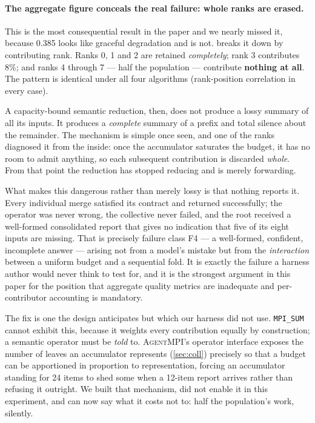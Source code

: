 \documentclass[10pt,twocolumn]{article}
\theoremstyle{definition}
\theoremstyle{plain}
\newcommand{\ampi}{\textsc{AgentMPI}}
\newcommand{\code}[1]{\texttt{\small #1}}
\begin{document}
\begin{table}[t]
\centering\scriptsize

\caption{Per-rank retention under a capacity-bound reduction. The aggregate figure of
0.385 conceals what actually happened: the first three ranks are retained completely and
\NErasedRanks{} of \NTotalRanks{} are erased entirely, identically under every tree shape.}
\label{tab:erasure}
\end{table}

\paragraph{The aggregate figure conceals the real failure: whole ranks are erased.} This
is the most consequential result in the paper and we nearly missed it, because 0.385 looks
like graceful degradation and is not.  breaks it down by contributing
rank. Ranks 0, 1 and 2 are retained \emph{completely}; rank 3 contributes 8\%; and ranks 4
through 7 --- half the population --- contribute \textbf{nothing at all}. The pattern is
identical under all four algorithms (rank-position correlation \NErasureCorr{} in every
case).

A capacity-bound semantic reduction, then, does not produce a lossy summary of all its
inputs. It produces a \emph{complete} summary of a prefix and total silence about the
remainder. The mechanism is simple once seen, and one of the ranks diagnosed it from the
inside: once the accumulator saturates the budget, it has no room to admit anything, so
each subsequent contribution is discarded \emph{whole}. From that point the reduction has
stopped reducing and is merely forwarding.

What makes this dangerous rather than merely lossy is that nothing reports it. Every
individual merge satisfied its contract and returned successfully; the operator was never
wrong, the collective never failed, and the root received a well-formed consolidated report
that gives no indication that five of its eight inputs are missing. That is precisely
failure class F4 --- a well-formed, confident, incomplete answer --- arising not from a
model's mistake but from the \emph{interaction} between a uniform budget and a sequential
fold. It is exactly the failure a harness author would never think to test for, and it is
the strongest argument in this paper for the position that aggregate quality metrics are
inadequate and per-contributor accounting is mandatory.

The fix is one the design anticipates but which our harness did not use. \code{MPI\_SUM}
cannot exhibit this, because it weights every contribution equally by construction; a
semantic operator must be \emph{told} to. \ampi{}'s operator interface exposes the number
of leaves an accumulator represents (\cref{sec:coll}) precisely so that a budget can be
apportioned in proportion to representation, forcing an accumulator standing for 24 items
to shed some when a 12-item report arrives rather than refusing it outright. We built that
mechanism, did not enable it in this experiment, and can now say what it costs not to:
half the population's work, silently.
\end{document}
